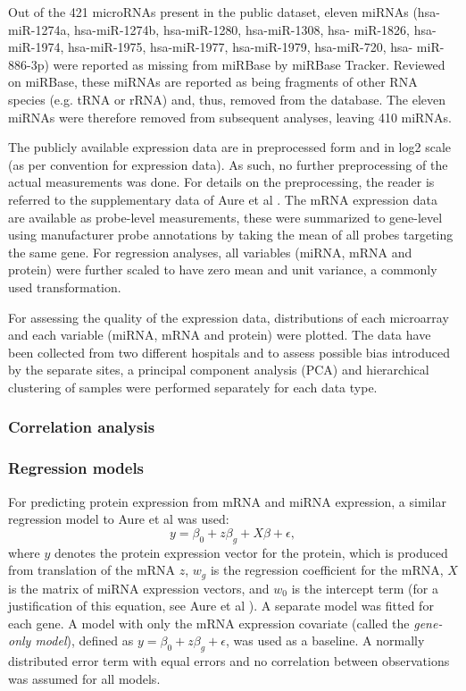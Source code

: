Out of the 421 microRNAs present in the public dataset, eleven miRNAs (hsa-
miR-1274a, hsa-miR-1274b, hsa-miR-1280, hsa-miR-1308, hsa- miR-1826, hsa-
miR-1974, hsa-miR-1975, hsa-miR-1977, hsa-miR-1979, hsa-miR-720, hsa-
miR-886-3p) were reported as missing from miRBase by miRBase Tracker. Reviewed
on miRBase, these miRNAs are reported as being fragments of other RNA species
(e.g. tRNA or rRNA) and, thus, removed from the database. The eleven miRNAs
were therefore removed from subsequent analyses, leaving 410 miRNAs.

The publicly available expression data are in preprocessed form and 
in log2 scale (as per convention for expression data). As such,
no further preprocessing of the actual measurements was done. For details on
the preprocessing, the reader is referred to the supplementary data of Aure et
al \citep{Aure2015}. The mRNA expression data are available as probe-level
measurements, these were summarized to gene-level using manufacturer probe
annotations by taking the mean of all probes targeting the same gene.
For regression analyses, all variables (miRNA, mRNA
and protein) were further scaled to have zero mean and unit variance,
a commonly used transformation.

For assessing the quality of the expression data, distributions of each
microarray and each variable (miRNA, mRNA and protein) were plotted. The data
have been collected from two different hospitals and to assess possible bias
introduced by the separate sites, a principal component analysis (PCA) and
hierarchical clustering of samples were performed separately for each data
type.



\subsubsection{Correlation analysis}


\subsubsection{Regression models}

For predicting protein expression from mRNA and miRNA expression, a similar
regression model to Aure et al was used:
\begin{equation}
	\label{eq:reg-model}
	y = \beta_0 + z \beta_g + X \beta + \epsilon,
\end{equation}
where $y$ denotes the protein expression vector for the protein, which
is produced from translation of the mRNA $z$, $w_g$
is the regression coefficient for the mRNA, $X$ is the matrix of miRNA
expression vectors, and $w_0$ is the intercept term
(for a justification of this equation, see Aure et al \citep{Aure2015}).
A separate model was fitted for each gene.
A model with only the mRNA expression covariate (called the \emph{gene-only model}),
defined as $y = \beta_0 + z \beta_g + \epsilon$, was used as a baseline.
A normally distributed error term with equal errors and no correlation
between observations was assumed for all models.

